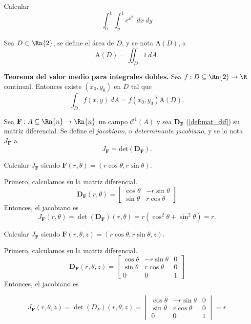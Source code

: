 \begin{tarea}Calcular  $$ \int_{0}^{1}\int_{y}^{1} e^{x^{2}} \:\: dx\:dy $$
\end{tarea}



\begin{definition}  Sea $D\subset\Rn{2}$,  se define el \'area de $D$,  y se nota $\text{A}(D)$,  a  
    \[
        \text{A}(D)=\iint_D1\:dA.
    \]
\end{definition}



\begin{theorem}
    \textbf{Teorema del valor medio para integrales dobles.}   Sea $f:D\subseteq\Rn{2}\to\R$ continual.  Entonces existe $(x_0,y_0)$ en $D$ tal que
    \[
        \int_D f(x,y)\:dA=f(x_0,y_0)\text{A}(D).
    \]
\end{theorem}

\begin{definition}
    Sea $\mathbf{F}:A\subseteq\Rn{n}\to\Rn{n}$ un campo $\mathcal{C}^1(A)$ y sea $\boldsymbol{D}_\mathbf{F}$ (\autoref{def:mat_dif}) su matriz diferencial.  Se define el \emph{jacobiano}, o \emph{determinante jacobiano}, y se lo nota $J_\mathbf{F}$ a 
    \[
        J_\mathbf{F}=\text{det}(\boldsymbol{D}_\mathbf{F}).
    \]
\end{definition}


\begin{example}  Calcular $J_\mathbf{F}$ siendo  \( \mathbf{F}(r, \theta) = (r\cos\theta, r\sin\theta) \).

 Primero, calculamos su la matriz diferencial.
       \[
       \boldsymbol{D}_{\mathbf{F}}(r, \theta) 
       =
       \begin{bmatrix}
       \cos\theta & -r\sin\theta \\
       \sin\theta & r\cos\theta
       \end{bmatrix}
       \]
       Entonces, el jacobiano es
       \[
       J_{\mathbf{F}}(r, \theta) = \det(\boldsymbol{D}_{\mathbf{F}})(r, \theta) = 
      r(\cos^2\theta + \sin^2\theta) = r.
       \]
   \end{example}
   
   \begin{example}  Calcular $J_\mathbf{F}$   siendo   \( \mathbf{F}(r, \theta, z) = (r\cos\theta, r\sin\theta, z) \).
        
  Primero, calculamos su la matriz diferencial.
   \[
    \boldsymbol{D}_{\mathbf{F}} (r, \theta,  z)=
    \begin{bmatrix}
   \cos\theta & -r\sin\theta & 0 \\
   \sin\theta & r\cos\theta & 0 \\
   0 & 0 & 1
   \end{bmatrix}
   \]   
    Entonces, el jacobiano es 
   
   \[
   J_\mathbf{F} (r, \theta, z) = \det(D_F)(r, \theta, z)  = 
   \begin{vmatrix}
   \cos\theta & -r\sin\theta & 0 \\
   \sin\theta & r\cos\theta & 0 \\
   0 & 0 & 1
   \end{vmatrix}
   = r
   \]
   \end{example}
   
